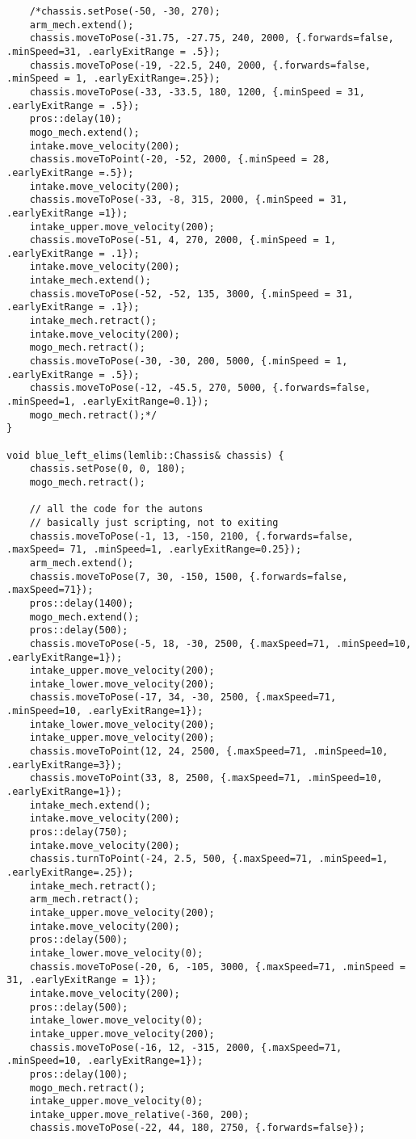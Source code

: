 \begin{verbatim}
    /*chassis.setPose(-50, -30, 270);
    arm_mech.extend();
    chassis.moveToPose(-31.75, -27.75, 240, 2000, {.forwards=false, .minSpeed=31, .earlyExitRange = .5});
    chassis.moveToPose(-19, -22.5, 240, 2000, {.forwards=false, .minSpeed = 1, .earlyExitRange=.25});
    chassis.moveToPose(-33, -33.5, 180, 1200, {.minSpeed = 31, .earlyExitRange = .5});
    pros::delay(10);
    mogo_mech.extend();
    intake.move_velocity(200);
    chassis.moveToPoint(-20, -52, 2000, {.minSpeed = 28, .earlyExitRange =.5});
    intake.move_velocity(200);
    chassis.moveToPose(-33, -8, 315, 2000, {.minSpeed = 31, .earlyExitRange =1});
    intake_upper.move_velocity(200);
    chassis.moveToPose(-51, 4, 270, 2000, {.minSpeed = 1, .earlyExitRange = .1});
    intake.move_velocity(200);
    intake_mech.extend();
    chassis.moveToPose(-52, -52, 135, 3000, {.minSpeed = 31, .earlyExitRange = .1});
    intake_mech.retract();
    intake.move_velocity(200);
    mogo_mech.retract();
    chassis.moveToPose(-30, -30, 200, 5000, {.minSpeed = 1, .earlyExitRange = .5});
    chassis.moveToPose(-12, -45.5, 270, 5000, {.forwards=false, .minSpeed=1, .earlyExitRange=0.1});
    mogo_mech.retract();*/
}

void blue_left_elims(lemlib::Chassis& chassis) {
    chassis.setPose(0, 0, 180);
    mogo_mech.retract();

    // all the code for the autons
    // basically just scripting, not to exiting
    chassis.moveToPose(-1, 13, -150, 2100, {.forwards=false, .maxSpeed= 71, .minSpeed=1, .earlyExitRange=0.25});
    arm_mech.extend();
    chassis.moveToPose(7, 30, -150, 1500, {.forwards=false, .maxSpeed=71});
    pros::delay(1400);
    mogo_mech.extend();
    pros::delay(500);
    chassis.moveToPose(-5, 18, -30, 2500, {.maxSpeed=71, .minSpeed=10, .earlyExitRange=1});
    intake_upper.move_velocity(200);
    intake_lower.move_velocity(200);
    chassis.moveToPose(-17, 34, -30, 2500, {.maxSpeed=71, .minSpeed=10, .earlyExitRange=1});
    intake_lower.move_velocity(200);
    intake_upper.move_velocity(200);
    chassis.moveToPoint(12, 24, 2500, {.maxSpeed=71, .minSpeed=10, .earlyExitRange=3});
    chassis.moveToPoint(33, 8, 2500, {.maxSpeed=71, .minSpeed=10, .earlyExitRange=1});
    intake_mech.extend();
    intake.move_velocity(200);
    pros::delay(750);
    intake.move_velocity(200);
    chassis.turnToPoint(-24, 2.5, 500, {.maxSpeed=71, .minSpeed=1, .earlyExitRange=.25});
    intake_mech.retract();
    arm_mech.retract();
    intake_upper.move_velocity(200);
    intake.move_velocity(200);
    pros::delay(500);
    intake_lower.move_velocity(0);
    chassis.moveToPose(-20, 6, -105, 3000, {.maxSpeed=71, .minSpeed = 31, .earlyExitRange = 1});
    intake.move_velocity(200);
    pros::delay(500);
    intake_lower.move_velocity(0);
    intake_upper.move_velocity(200);
    chassis.moveToPose(-16, 12, -315, 2000, {.maxSpeed=71, .minSpeed=10, .earlyExitRange=1});
    pros::delay(100);
    mogo_mech.retract();
    intake_upper.move_velocity(0);
    intake_upper.move_relative(-360, 200);
    chassis.moveToPose(-22, 44, 180, 2750, {.forwards=false});
    


\end{verbatim}
